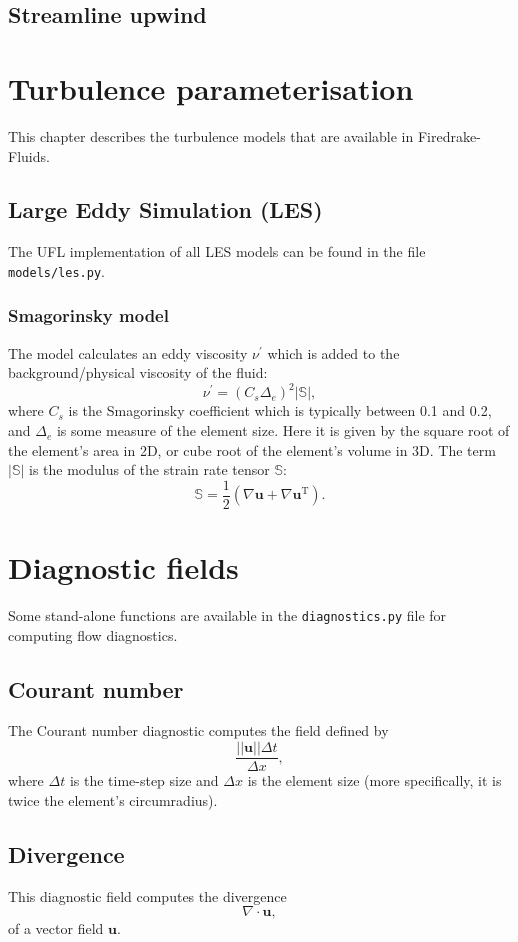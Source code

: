 \documentclass[a4paper,11pt]{report}
\begin{document}
\section{Streamline upwind}


\chapter{Turbulence parameterisation}\label{chap:turbulence_parameterisation}
This chapter describes the turbulence models that are available in Firedrake-Fluids.

\section{Large Eddy Simulation (LES)}
The UFL implementation of all LES models can be found in the file \texttt{models/les.py}.

\subsection{Smagorinsky model}
The \cite{Smagorinsky_1963} model calculates an eddy viscosity $\nu^\prime$ which is added to the background/physical viscosity of the fluid:
\begin{equation}
   \nu^\prime = \left(C_s\Delta_e\right)^2|\mathbb{S}|,
\end{equation}
where $C_s$ is the Smagorinsky coefficient which is typically between 0.1 and 0.2, and $\Delta_e$ is some measure of the element size. Here it is given by the square root of the element's area in 2D, or cube root of the element's volume in 3D. The term $|\mathbb{S}|$ is the modulus of the strain rate tensor $\mathbb{S}$:
\begin{equation}
 \mathbb{S} = \frac{1}{2}\left(\nabla\mathbf{u} + \nabla\mathbf{u}^{\mathrm{T}}\right).
\end{equation}


\chapter{Diagnostic fields}
Some stand-alone functions are available in the \texttt{diagnostics.py} file for computing flow diagnostics.

\section{Courant number}
The Courant number diagnostic computes the field defined by
\begin{equation}
   \frac{||\mathbf{u}||\Delta t}{\Delta x},
\end{equation}
where $\Delta t$ is the time-step size and $\Delta x$ is the element size (more specifically, it is twice the element's circumradius).

\section{Divergence}
This diagnostic field computes the divergence
\begin{equation}
   \nabla\cdot\mathbf{u},
\end{equation}
of a vector field $\mathbf{u}$.



\end{document}

